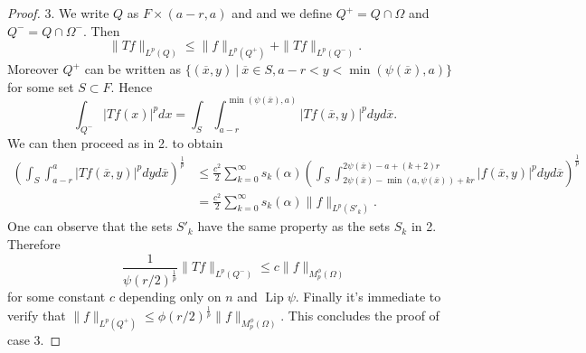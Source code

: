 \documentclass[12pt]{article}
\theoremstyle{definition}
\DeclareMathOperator\Lip{Lip}
\begin{document}
\begin{proof}
3. We write $Q$ as $F \times (a-r,a)$ and and we define $Q^+=Q\cap\Omega$ and $Q^-=Q\cap\Omega^-.$ Then 
\[\|Tf\|_{L^p(Q)}\le\|f\|_{L^p(Q^+)}+\|Tf\|_{L^p(Q^-)}.\]
Moreover $Q^+$ can be written as $\{ (\overline x, y) \ | \ \overline x \in S, a-r<y<\min(\psi(\overline x),a)\}$ for some set $S \subset F.$ Hence
\[ \int_{Q^-} |Tf(x)|^pdx = \int_S \int_{a-r}^{\min(\psi(\overline x),a)} |Tf(\overline x,y)|^pdy d\overline x. \]
We can then proceed as in 2. to obtain
\begin{align*}
 \left(\int_S\int_{a-r}^{a}|Tf(\overline x,y)|^p dy d\overline x\right)^{\frac{1}{p}} &\le \frac{c^2}{2} \sum_{k=0}^\infty s_k(\alpha) \left (\int_S \int_{2\psi(\overline x) -\min(a,\psi(\overline x)) +kr}^{2\psi(\overline x) -a+(k+2)r}|f(\overline x, y)|^p  dy d\overline x\right) ^{\frac{1}{p}}\\
 &=\frac{c^2}{2} \sum_{k=0}^\infty s_k(\alpha) \|f\|_{L^p(S'_k)}.
 \end{align*}
One can observe that the sets $S'_k$ have the same property as the sets $S_k$ in 2. Therefore
\[ \frac{1}{\psi(r/2)^{\frac{1}{p}}} \| Tf\|_{L^p(Q^-)} \le c \| f\|_{M_p^\phi(\Omega)} \]
for some constant $c$ depending only on $n$ and $\Lip \psi$. Finally it's immediate to verify that $\| f\|_{L^p(Q^+)} \le \phi(r/2)^{\frac{1}{p}} \| f\|_{M_p^\phi(\Omega)}.$ This concludes the proof of case 3.
\end{proof} 


\end{document}
